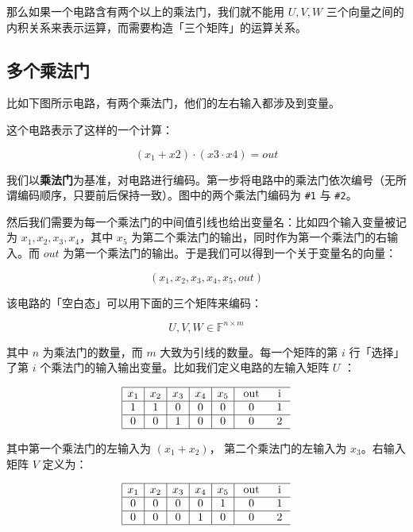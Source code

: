 那么如果一个电路含有两个以上的乘法门，我们就不能用 \(U,V,W\)
三个向量之间的内积关系来表示运算，而需要构造「三个矩阵」的运算关系。

\hypertarget{ux591aux4e2aux4e58ux6cd5ux95e8}{%
\subsection{多个乘法门}\label{ux591aux4e2aux4e58ux6cd5ux95e8}}

比如下图所示电路，有两个乘法门，他们的左右输入都涉及到变量。


这个电路表示了这样的一个计算：

\[
(x_1 + x2) \cdot (x3 \cdot x4) = out
\]

我们以\textbf{乘法门}为基准，对电路进行编码。第一步将电路中的乘法门依次编号（无所谓编码顺序，只要前后保持一致）。图中的两个乘法门编码为
\texttt{\#1} 与 \texttt{\#2}。

然后我们需要为每一个乘法门的中间值引线也给出变量名：比如四个输入变量被记为
\(x_1, x_2, x_3, x_4\)，其中 \(x_5\)
为第二个乘法门的输出，同时作为第一个乘法门的右输入。而 \(out\)
为第一个乘法门的输出。于是我们可以得到一个关于变量名的向量：

\[
(x_1, x_2, x_3, x_4, x_5, out)
\]

该电路的「空白态」可以用下面的三个矩阵来编码：

\[
U, V, W \in \mathbb{F}^{n\times m}
\]

其中 \(n\) 为乘法门的数量，而 \(m\) 大致为引线的数量。每一个矩阵的第
\(i\) 行「选择」了第 \(i\)
个乘法门的输入输出变量。比如我们定义电路的左输入矩阵 \(U\) ：

$$
\begin{array}{|c|c|c|c|c|cc}
\hline x_1 & x_2 & x_3 & x_4 & x_5 & \text { out } & \text { i } \\
\hline 1 & 1 & 0 & 0 & 0 & 0 & 1 \\
\hline 0 & 0 & 1 & 0 & 0 & 0 & 2 \\
\hline
\end{array}
$$

其中第一个乘法门的左输入为 \((x_1+x_2)\)， 第二个乘法门的左输入为
\(x_3\)。右输入矩阵 \(V\) 定义为：

$$
\begin{array}{|c|c|c|c|c|cc}
\hline x_1 & x_2 & x_3 & x_4 & x_5 & \text { out } & \text { i } \\
\hline 0 & 0 & 0 & 0 & 1 & 0 & 1 \\
\hline 0 & 0 & 0 & 1 & 0 & 0 & 2 \\
\hline
\end{array}
$$

